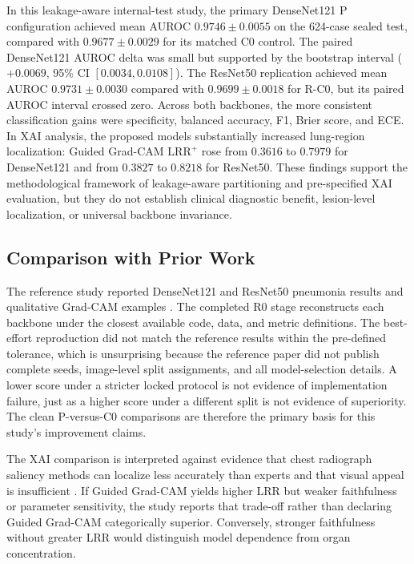 \documentclass[runningheads]{llncs}
\newcommand{\lrrpos}{\mathrm{LRR}^{+}}
\newcommand{\citep}[1]{\cite{#1}}
\begin{document}
In this leakage-aware internal-test study, the primary DenseNet121 P configuration
achieved mean AUROC $0.9746 \pm 0.0055$ on the 624-case sealed test, compared
with $0.9677 \pm 0.0029$ for its matched C0 control. The paired DenseNet121 AUROC
delta was small but supported by the bootstrap interval ($+0.0069$, 95\% CI
$[0.0034,0.0108]$). The ResNet50 replication achieved mean AUROC
$0.9731 \pm 0.0030$ compared with $0.9699 \pm 0.0018$ for R-C0, but its paired
AUROC interval crossed zero. Across both backbones, the more consistent
classification gains were specificity, balanced accuracy, F1, Brier score, and
ECE. In XAI analysis, the proposed models substantially increased lung-region
localization: Guided Grad-CAM $\lrrpos$ rose from $0.3616$ to $0.7979$ for
DenseNet121 and from $0.3827$ to $0.8218$ for ResNet50. These findings support
the methodological framework of leakage-aware partitioning and pre-specified XAI
evaluation, but they do not establish clinical diagnostic benefit, lesion-level
localization, or universal backbone invariance.

\subsection{Comparison with Prior Work}

The reference study reported DenseNet121 and ResNet50 pneumonia results and
qualitative Grad-CAM examples \citep{erukude2025}. The completed R0 stage reconstructs
each backbone under the closest available code, data, and metric definitions. The
best-effort reproduction did not match the reference results within the
pre-defined tolerance, which is unsurprising because the reference paper did not
publish complete seeds, image-level split assignments, and all model-selection
details. A lower score under a stricter locked protocol is not evidence of
implementation failure, just as a higher score under a different split is not
evidence of superiority. The clean P-versus-C0 comparisons are therefore the
primary basis for this study's improvement claims.

The XAI comparison is interpreted against evidence that chest radiograph
saliency methods can localize less accurately than experts and that visual appeal is
insufficient \citep{saporta2022,adebayo2018}. If Guided Grad-CAM yields higher LRR but weaker
faithfulness or parameter sensitivity, the study reports that trade-off rather
than declaring Guided Grad-CAM categorically superior. Conversely, stronger faithfulness without
greater LRR would distinguish model dependence from organ concentration.
\end{document}

